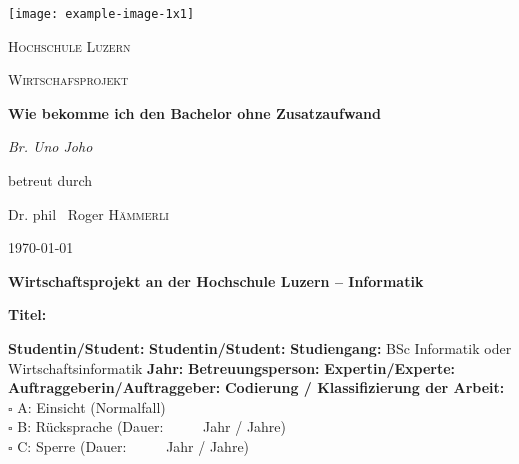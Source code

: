 

\begin{titlepage}
	\centering
	\texttt{[image: example-image-1x1]}\par\vspace{1cm}
	{\scshape\LARGE Hochschule Luzern \par}
	\vspace{1cm}
	{\scshape\Large Wirtschafsprojekt\par}
	\vspace{1.5cm}
	{\huge\bfseries Wie bekomme ich den Bachelor ohne Zusatzaufwand\par}
	\vspace{2cm}
	{\Large\itshape Br. Uno Joho\par}
	\vfill
	betreut durch\par
	Dr. phil ~Roger \textsc{Hämmerli}
	
	\vfill
	
	{\large \today\par}
\end{titlepage}

\newpage

\noindent
\fontsize{12}{14}
\textbf{Wirtschaftsprojekt an der Hochschule Luzern -- Informatik} \\ \vspace*{0.6cm}

\fontsize{10.5}{12}
\noindent
\textbf{Titel:} \\ \vspace*{0.2cm}

\noindent
\textbf{Studentin/Student:} \newline \newline
\textbf{Studentin/Student:} \newline \newline
\textbf{Studiengang:} BSc Informatik oder Wirtschaftsinformatik  \newline \newline
\textbf{Jahr:} \newline \newline
\textbf{Betreuungsperson:} \newline \newline
\textbf{Expertin/Experte:} \newline \newline
\textbf{Auftraggeberin/Auftraggeber:} \newline \newline \newline
\textbf{Codierung / Klassifizierung der Arbeit:}\\
$\square$ A: Einsicht 	(Normalfall) \\
$\square$ B: R\"ucksprache	(Dauer: \ \ \ \ \        Jahr / Jahre)\\
$\square$ C: Sperre	(Dauer: \ \ \ \ \        Jahr / Jahre)\\


